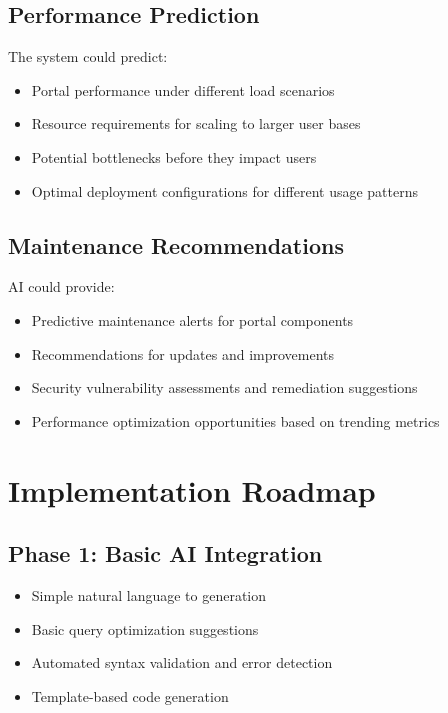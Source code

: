 \subsection{Performance Prediction}

The system could predict:
\begin{itemize}
\item Portal performance under different load scenarios
\item Resource requirements for scaling to larger user bases
\item Potential bottlenecks before they impact users
\item Optimal deployment configurations for different usage patterns
\end{itemize}

\subsection{Maintenance Recommendations}

AI could provide:
\begin{itemize}
\item Predictive maintenance alerts for portal components
\item Recommendations for \webbaselet{} updates and improvements
\item Security vulnerability assessments and remediation suggestions
\item Performance optimization opportunities based on trending metrics
\end{itemize}

\section{Implementation Roadmap}
\label{sec:implementation-roadmap}

\subsection{Phase 1: Basic AI Integration}
\begin{itemize}
\item Simple natural language to \wbdl{} generation
\item Basic query optimization suggestions
\item Automated syntax validation and error detection
\item Template-based code generation
\end{itemize}

